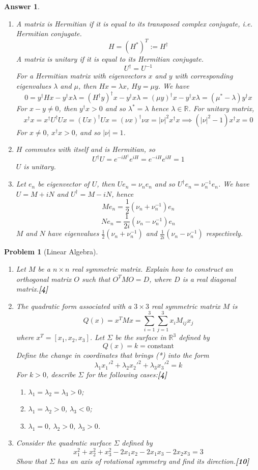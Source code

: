 \documentclass[a4paper]{article}
\newtheorem{ans}{Answer}[section]
\theoremstyle{new}
\newtheorem{qns}{Problem}[section]
\begin{document}
\begin{ans}\leavevmode
\begin{enumerate}[label=(\roman*)]
\item A matrix is Hermitian if it is equal to its transposed complex conjugate, i.e. Hermitian conjugate.
$$H=(H^*)^T:=H^\dag$$
A matrix is unitary if it is equal to its Hermitian conjugate.
$$U^\dag=U^{-1}$$
For a Hermitian matrix with eigenvectors $x$ and $y$ with corresponding eigenvalues $\lambda$ and $\mu$, then $Hx=\lambda x$, $Hy=\mu y$. We have
$$0=y^\dag Hx-y^\dag x\lambda=(H^\dag y)^\dag x-y^\dag x\lambda=(\mu y)^\dag x-y^\dag x\lambda=(\mu^*-\lambda)y^\dag x$$
For $x-y\neq 0$, then $y^\dag x>0$ and so $\lambda^*=\lambda$ hence $\lambda\in\mathbb{R}$. For unitary matrix,
$$x^\dag x=x^\dag U^\dag Ux=(Ux)^\dag Ux=(\nu x)^\dag \nu x=|\nu|^2x^\dag x\implies(|\nu|^2-1)x^\dag x=0$$
For $x\neq0$, $x^\dag x>0$, and so $|\nu|=1$.
\item $H$ commutes with itself and is Hermitian, so
$$U^\dag U=e^{-iH^\dag}e^{iH}=e^{-iH}e^{iH}=1$$
$U$ is unitary.
\item Let $e_n$ be eigenvector of $U$, then $Ue_n=\nu_ne_n$ and so $U^\dag e_n=\nu_n^{-1}e_n$. We have $U=M+iN$ and $U^\dag=M-iN$, hence
$$Me_n=\frac{1}{2}(\nu_n+\nu_n^{-1})e_n$$
$$Ne_n=\frac{1}{2i}(\nu_n-\nu_n^{-1})e_n$$
$M$ and $N$ have eigenvalues $\frac{1}{2}(\nu_n+\nu_n^{-1})$ and $\frac{1}{2i}(\nu_n-\nu_n^{-1})$ respectively.
\end{enumerate}
\end{ans}
\newpage
\begin{qns}[Linear Algebra]\leavevmode
\begin{enumerate}[label=(\roman*)]
\item Let $M$ be a $n\times n$ real symmetric matrix. Explain how to construct an orthogonal matrix $O$ such that $O^TMO=D$, where $D$ is a real diagonal matrix.\hfill \textbf{[4]}
\item The quadratic form associated with a $3\times3$ real symmetric matrix $M$ is
$$Q(x)=x^TMx=\sum_{i=1}^3\sum_{j=1}^3x_iM_{ij}x_j$$
where $x^T=[x_1,x_2,x_3]$. Let $\Sigma$ be the surface in $\mathbb{R}^3$ defined by 
\begin{equation}Q(x)=k=\text{constant}\tag{*}
\end{equation}
Define the change in coordinates that brings (*) into the form $$\lambda_1x_1'^2+\lambda_2x_2'^2+\lambda_3x_3'^2=k$$ 
For $k>0$, describe $\Sigma$ for the following cases:\hfill \textbf{[4]}
\begin{enumerate}[label=(\alph*)]
    \item $\lambda_1=\lambda_2=\lambda_3>0$;
    \item $\lambda_1=\lambda_2>0$, $\lambda_3<0$;
    \item $\lambda_1=0$, $\lambda_2>0$, $\lambda_3>0$.
\end{enumerate}
\item Consider the quadratic surface $\Sigma$ defined by
$$x^2_1 + x_2^2 + x^2_3 − 2x_1x_2 − 2x_1x_3 − 2x_2x_3 = 3$$
Show that $\Sigma$ has an axis of rotational symmetry and find its direction.\hfill \textbf{[10]}
\end{enumerate}
\end{qns}
\end{document}
